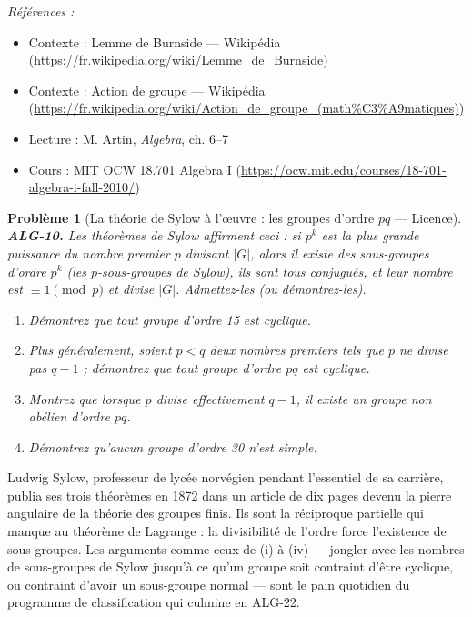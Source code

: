 \documentclass[11pt]{article}
\newtheorem{problem}{Problème}
\newenvironment{refs}{\par\small\noindent\emph{Références :}\begin{itemize}\setlength\itemsep{0pt}}{\end{itemize}\normalsize}
\begin{document}
\begin{refs}
\item Contexte : Lemme de Burnside --- Wikipédia (\url{https://fr.wikipedia.org/wiki/Lemme_de_Burnside})
\item Contexte : Action de groupe --- Wikipédia (\url{https://fr.wikipedia.org/wiki/Action_de_groupe_(math%C3%A9matiques)})
\item Lecture : M. Artin, \textit{Algebra}, ch. 6--7
\item Cours : MIT OCW 18.701 Algebra I (\url{https://ocw.mit.edu/courses/18-701-algebra-i-fall-2010/})
\end{refs}

\bigskip

\begin{problem}[{La théorie de Sylow à l'\oe{}uvre : les groupes d'ordre $pq$ --- Licence}]
\textbf{ALG-10.} Les théorèmes de Sylow affirment ceci : si $p^k$ est la plus grande puissance
du nombre premier $p$ divisant $|G|$, alors il existe des sous-groupes d'ordre $p^k$ (les
$p$-sous-groupes de Sylow), ils sont tous conjugués, et leur nombre est $\equiv 1 \pmod{p}$ et divise
$|G|$. Admettez-les (ou démontrez-les).
\begin{enumerate}
\item[(i)] Démontrez que tout groupe d'ordre 15 est cyclique.
\item[(ii)] Plus généralement,
soient $p < q$ deux nombres premiers tels que $p$ ne divise pas $q - 1$ ; démontrez que tout groupe
d'ordre $pq$ est cyclique.
\item[(iii)] Montrez que lorsque $p$ divise effectivement $q - 1$, il existe un groupe non abélien d'ordre
$pq$.
\item[(iv)] Démontrez qu'aucun groupe d'ordre 30 n'est simple.
\end{enumerate}

\end{problem}

\noindent Ludwig Sylow, professeur de lycée norvégien pendant l'essentiel de sa carrière, publia
ses trois théorèmes en 1872 dans un article de dix pages devenu la pierre angulaire de la théorie des groupes
finis. Ils sont la réciproque partielle qui manque au théorème de Lagrange : la divisibilité de l'ordre force
l'existence de sous-groupes. Les arguments comme ceux de (i) à (iv) --- jongler avec les nombres de sous-groupes
de Sylow jusqu'à ce qu'un groupe soit contraint d'être cyclique, ou contraint d'avoir un sous-groupe normal ---
sont le pain quotidien du programme de classification qui culmine en ALG-22.
\end{document}
